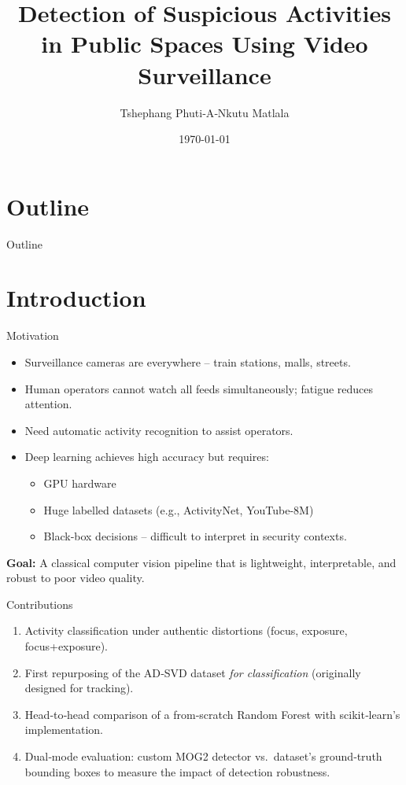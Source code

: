 \documentclass[compress,aspectratio=169]{beamer}
\title{Detection of Suspicious Activities in Public Spaces Using Video Surveillance}
\subtitle{}
\author{Tshephang Phuti‑A‑Nkutu Matlala}
\institute[Academy of Computer Science and Software Engineering]{
  Academy of Computer Science and Software Engineering \\
  University of Johannesburg, Johannesburg, South Africa \\
  \url{223004635@student.uj.ac.za} \\
  \vspace{0.2cm}
  \footnotesize \textbf{Code:} \url{https://github.com/mat-tp/suspicious-activity-detection}
}
\date{\today}
\begin{document}
\begin{frame}
    \titlepage
\end{frame}

\section*{Outline}
\begin{frame}[allowframebreaks]{Outline}
    \tableofcontents
\end{frame}

\section{Introduction}

\begin{frame}{Motivation}
  \begin{itemize}
    \item Surveillance cameras are everywhere – train stations, malls, streets.
    \item Human operators cannot watch all feeds simultaneously; fatigue reduces attention.
    \item Need automatic activity recognition to \alert{assist} operators.
    \item Deep learning achieves high accuracy but requires:
      \begin{itemize}
        \item GPU hardware
        \item Huge labelled datasets (e.g., ActivityNet, YouTube-8M)
        \item Black‑box decisions – difficult to interpret in security contexts.
      \end{itemize}
  \end{itemize}
  \vfill
  \textbf{Goal:} A classical computer vision pipeline that is \alert{lightweight}, \alert{interpretable}, and \alert{robust} to poor video quality.
\end{frame}

\begin{frame}{Contributions}
  \begin{enumerate}
    \item Activity classification under \alert{authentic distortions} (focus, exposure, focus+exposure).
    \item First repurposing of the AD‑SVD dataset \emph{for classification} (originally designed for tracking).
    \item Head‑to‑head comparison of a \alert{from‑scratch Random Forest} with scikit‑learn's implementation.
    \item Dual‑mode evaluation: \alert{custom MOG2 detector} vs.\ dataset's ground‑truth bounding boxes to measure the impact of detection robustness.
  \end{enumerate}
\end{frame}
\end{document}
